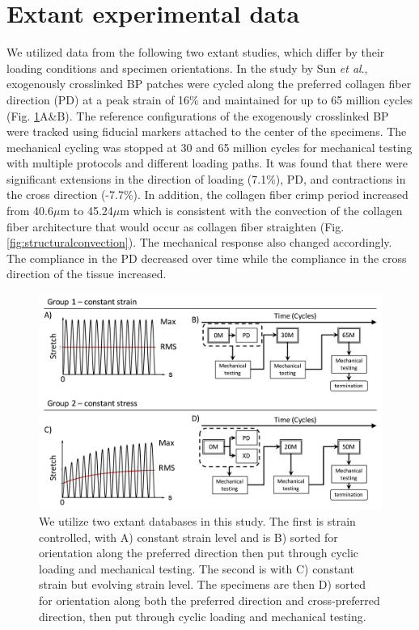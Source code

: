 

\section{Extant experimental data}
\label{sec:database}

	We utilized data from the following two extant studies, which differ by their loading conditions and specimen orientations. In the study by Sun \textit{et al}.\cite{sun_response_2004}, exogenously crosslinked BP patches were cycled along the preferred collagen fiber direction (PD) at a peak strain of 16\% and maintained for up to 65 million cycles (Fig. \ref{fig:database}A\&B). The reference configurations of the exogenously crosslinked BP were tracked using fiducial markers attached to the center of the specimens\cite{sacks_biaxial_2000}. The mechanical cycling was stopped at 30 and 65 million cycles for mechanical testing with multiple protocols and different loading paths. It was found that there were significant extensions in the direction of loading (7.1\%), PD, and contractions in the cross direction (-7.7\%). In addition, the collagen fiber crimp period increased from 40.6$\mu$m to 45.24$\mu$m which is consistent with the convection of the collagen fiber architecture that would occur as collagen fiber straighten (Fig. \ref{fig:structuralconvection}). The mechanical response also changed accordingly. The compliance in the PD decreased over time while the compliance in the cross direction of the tissue increased. 
	

\begin{figure}[hbt]
\centering
\includegraphics[width=\textwidth]{Images/chapter4/figure5}
\caption{We utilize two extant databases in this study. The first is strain controlled, with A) constant strain level and is B) sorted for orientation along the preferred direction then put through cyclic loading and mechanical testing. The second is with C) constant strain but evolving strain level. The specimens are then D) sorted for orientation along both the preferred direction and cross-preferred direction, then put through cyclic loading and mechanical testing.}
\label{fig:database}
\end{figure}



